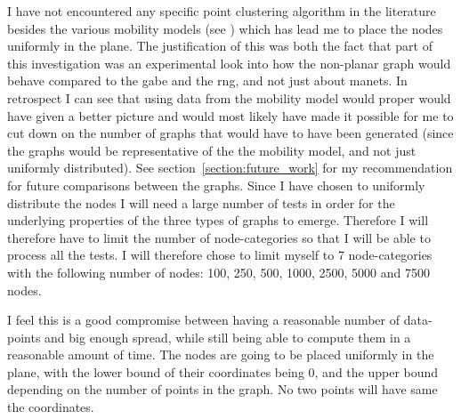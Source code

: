 I have not encountered any specific point clustering algorithm in the literature besides the various mobility models (see \cite{disasterArea, MobilityAdHocResearch}) which has lead me to place the nodes uniformly in the plane. The justification of this was both the fact that part of this investigation was an experimental look into how the non-planar graph would behave compared to the \ac{gabe} and the \ac{rng}, and not just about \acp{manet}. In retrospect I can see that using data from the mobility model would proper would have given a better picture and would most likely have made it possible for me to cut down on the number of graphs that would have to have been generated (since the graphs would be representative of the the mobility model, and not just uniformly distributed). See section~\ref{section:future_work} for my recommendation for future comparisons between the graphs.   
Since I have chosen to uniformly distribute the nodes I will need a large number of tests in order for the underlying properties of the three types of graphs to emerge. Therefore I will therefore have to limit the number of node-categories so that I will be able to process all the tests. I will therefore chose to limit myself to 7 node-categories with the following number of nodes: 100, 250, 500, 1000, 2500, 5000 and 7500 nodes.

I feel this is a good compromise between having a reasonable number of data-points and big enough spread, while still being able to compute them in a reasonable amount of time. The nodes are going to be placed uniformly in the plane, with the lower bound of their coordinates being 0, and the upper bound depending on the number of points in the graph. No two points will have same the coordinates. 

